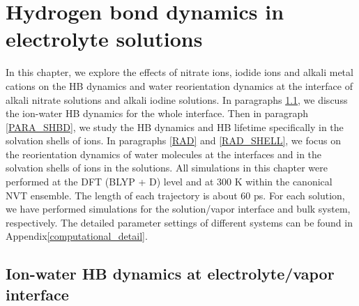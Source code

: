 \chapter{Hydrogen bond dynamics in electrolyte solutions}\label{CHAPTER_HBD_Solutions}
In this chapter, we explore the effects of nitrate ions, iodide ions and alkali metal cations 
on the HB dynamics and water reorientation dynamics at the interface of alkali nitrate solutions and alkali
iodine solutions. %
In paragraphs \ref{HBD_ITP}, we discuss the ion-water HB dynamics for the whole interface. 
Then in paragraph \ref{PARA_SHBD}, we study the HB dynamics and HB lifetime specifically in the solvation shells of ions.
In paragraphs \ref{RAD} and \ref{RAD_SHELL}, we focus on the reorientation dynamics of water molecules at the interfaces
and in the solvation shells of ions in the solutions.
All simulations in this chapter were performed at the DFT (BLYP + D) level and at 300 K within the canonical NVT ensemble.
The length of each trajectory is about 60 ps.
For each solution, we have performed simulations for the solution/vapor interface and bulk system, respectively. 
The detailed parameter settings of different systems can be found in Appendix\thinspace\ref{computational_detail}.

\section{Ion-water HB dynamics at electrolyte/vapor interface}\label{HBD_ITP}
